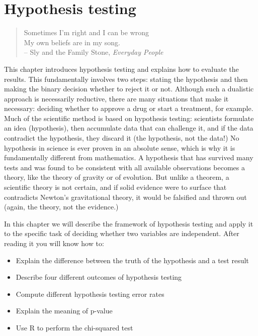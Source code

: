\documentclass[
]{book}
\providecommand{\tightlist}{%
  \setlength{\itemsep}{0pt}\setlength{\parskip}{0pt}}
\theoremstyle{definition}
\theoremstyle{definition}
\theoremstyle{definition}
\theoremstyle{remark}
\begin{document}
\hypertarget{hypothesis-testing}{%
\chapter{Hypothesis testing}\label{hypothesis-testing}}

\begin{quote}
Sometimes I'm right and I can be wrong\\
My own beliefs are in my song.\\
-- Sly and the Family Stone, \emph{Everyday People}
\end{quote}

This chapter introduces hypothesis testing and explains how to evaluate the results. This fundamentally involves two steps: stating the hypothesis and then making the binary decision whether to reject it or not. Although such a dualistic approach is necessarily reductive, there are many situations that make it necessary: deciding whether to approve a drug or start a treatment, for example. Much of the scientific method is based on hypothesis testing: scientists formulate an idea (hypothesis), then accumulate data that can challenge it, and if the data contradict the hypothesis, they discard it (the hypothesis, not the data!) No hypothesis in science is ever proven in an absolute sense, which is why it is fundamentally different from mathematics. A hypothesis that has survived many tests and was found to be consistent with all available observations becomes a theory, like the theory of gravity or of evolution. But unlike a theorem, a scientific theory is not certain, and if solid evidence were to surface that contradicts Newton's gravitational theory, it would be falsified and thrown out (again, the theory, not the evidence.)

In this chapter we will describe the framework of hypothesis testing and apply it to the specific task of deciding whether two variables are independent. After reading it you will know how to:

\begin{itemize}
\tightlist
\item
  Explain the difference between the truth of the hypothesis and a test result
\item
  Describe four different outcomes of hypothesis testing
\item
  Compute different hypothesis testing error rates
\item
  Explain the meaning of p-value
\item
  Use R to perform the chi-squared test
\end{itemize}
\end{document}
